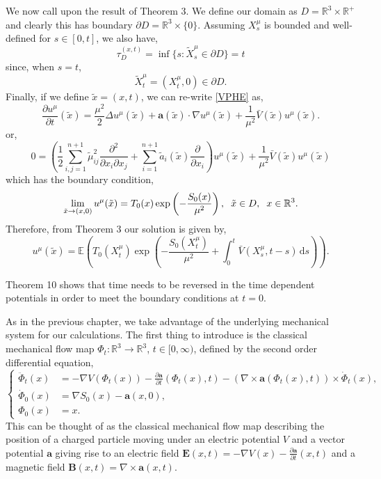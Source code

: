 \documentclass[a4paper,12pt,draft]{report}
\begin{document}
{$$$$
We now call upon the result of Theorem 3.  We define our domain as $D = \mathbb{R}^3 \times \mathbb{R}^+$ and clearly this has boundary $\partial D = \mathbb{R}^3 \times \{0\}$.  Assuming $X_s^\mu$ is bounded and well-defined for $s \in [0, t]$, we also have,
$$
\tau_D^{(x, t)} = \inf\{s : \tilde{X}_s^\mu \in \partial D\} = t
$$
since, when $s = t$,
$$
\tilde{X}_t^\mu = (X_t^\mu, 0) \in \partial D.
$$
Finally, if we define $\tilde{x} = (x, t)$, we can re-write \eqref{VPHE} as,
$$
\frac{\partial u^\mu}{\partial t}(\tilde{x}) = \frac{\mu^2}{2}\Delta u^\mu(\tilde{x}) + \mathbf{a}(\tilde{x})\cdot\nabla u^\mu(\tilde{x}) + \frac{1}{\mu^2}\bar{V}(\tilde{x})u^\mu(\tilde{x}).
$$
or,
$$
0 = \left(\frac{1}{2}\sum_{i, j = 1}^{n + 1}\tilde{\mu}_{ij}^2\frac{\partial^2}{\partial x_i \partial x_j} + \sum_{i = 1}^{n + 1}\tilde{a}_i(\tilde{x})\frac{\partial}{\partial x_i}\right)u^\mu(\tilde{x}) + \frac{1}{\mu^2}\bar{V}(\tilde{x})u^\mu(\tilde{x})
$$
which has the boundary condition,
$$
\lim_{\tilde{x} \to (x, 0)} u^\mu(\tilde{x}) = T_0(x)\exp\left(-\frac{S_0(x)}{\mu^2}\right), \hspace{0.2cm} \tilde{x} \in D, \hspace{0.2cm} x \in \mathbb{R}^3.
$$
Therefore, from Theorem 3 our solution is given by,
$$
u^\mu(\tilde{x}) = \mathbb{E}\left(T_0(X_t^\mu)\exp\left(-\frac{S_0(X_t^\mu)}{\mu^2} + \int_0^t\bar{V}(X_s^\mu, t - s)\,\mathrm{d}s\right)\right).\nonumber
$$

\qedhere
}

Theorem 10 shows that time needs to be reversed in the time dependent potentials in order to meet the boundary conditions at $t = 0$.

As in the previous chapter, we take advantage of the underlying mechanical system for our calculations.  The first thing to introduce is the classical mechanical flow map $\Phi_t : \mathbb{R}^3 \to \mathbb{R}^3$, $t \in [0, \infty)$, defined by the second order differential equation,
\begin{equation}
\left\{
\begin{aligned}
\ddot{\Phi}_t(x) & = -\nabla V(\Phi_t(x)) - \frac{\partial \mathbf{a}}{\partial t}(\Phi_t(x), t) - (\nabla \times \mathbf{a}(\Phi_t(x), t))\times\dot{\Phi}_t(x),\\ \label{CMFM2}
\dot{\Phi}_0(x) & = \nabla S_0(x) - \mathbf{a}(x, 0),\\
\Phi_0(x) & = x.
\end{aligned}
\right.
\end{equation}
This can be thought of as the classical mechanical flow map describing the position of a charged particle moving under an electric potential $V$ and a vector potential $\mathbf{a}$ giving rise to an electric field $\mathbf{E}(x, t) = -\nabla V(x) - \frac{\partial \mathbf{a}}{\partial t}(x, t)$ and a magnetic field $\mathbf{B}(x, t) = \nabla \times \mathbf{a}(x, t)$.
\end{document}
